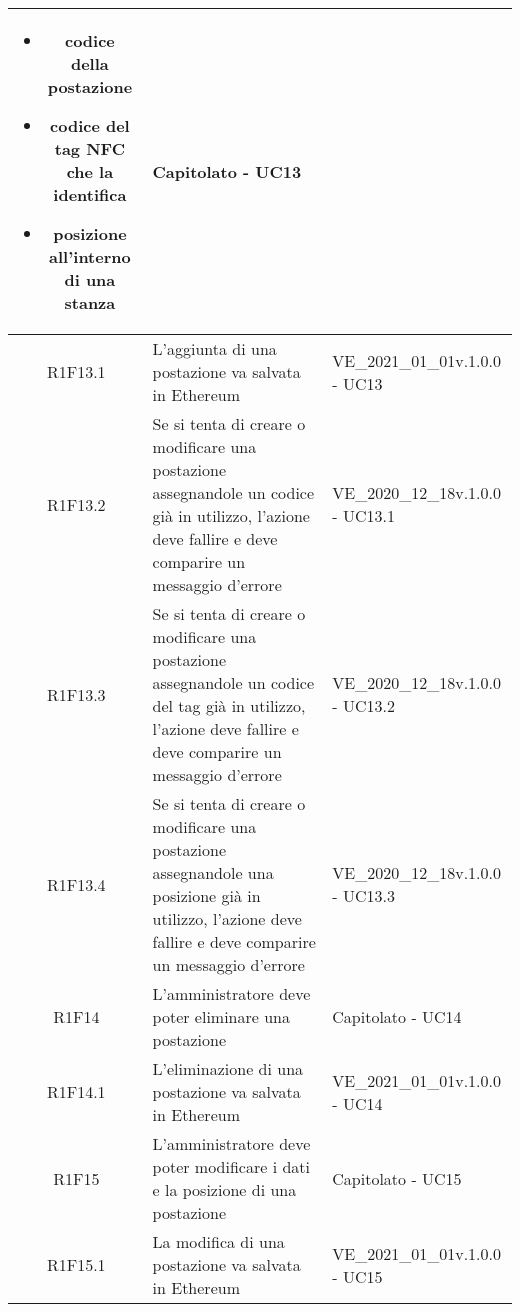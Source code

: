 \begin{center}
\begin{longtable}{|c|p{10cm}|p{4cm}|}
\begin{itemize}
			\item codice della postazione
			\item codice del tag NFC che la identifica
			\item posizione all'interno di una stanza
		\end{itemize} & Capitolato - UC13	\\
		\hline
		R1F13.1&L'aggiunta di una postazione va salvata in Ethereum	&VE\_2021\_01\_01v.1.0.0 - UC13 	\\
		\hline
		R1F13.2&	Se si tenta di creare o modificare una postazione assegnandole un codice già in utilizzo, l'azione deve fallire e deve comparire un messaggio d'errore& VE\_2020\_12\_18v.1.0.0 - UC13.1 	\\
		\hline
		R1F13.3&Se si tenta di creare o modificare una postazione assegnandole un codice del tag già in utilizzo, l'azione deve fallire e deve comparire un messaggio d'errore	&VE\_2020\_12\_18v.1.0.0 - UC13.2 	\\
		\hline
		R1F13.4&Se si tenta di creare o modificare una postazione assegnandole una posizione già in utilizzo, l'azione deve fallire e deve comparire un messaggio d'errore	&VE\_2020\_12\_18v.1.0.0 - UC13.3 	\\
		\hline
		R1F14&L'amministratore deve poter eliminare una postazione	& Capitolato - UC14	\\
		\hline
		R1F14.1	&L'eliminazione di una postazione va salvata in Ethereum	& VE\_2021\_01\_01v.1.0.0 - UC14	\\
		\hline
		R1F15&L'amministratore deve poter modificare i dati e la posizione di una postazione	& Capitolato - UC15	\\
		\hline
		R1F15.1&	La modifica di una postazione va salvata in Ethereum& VE\_2021\_01\_01v.1.0.0 - UC15	\\
		\hline
		

\end{longtable}
\end{center}
